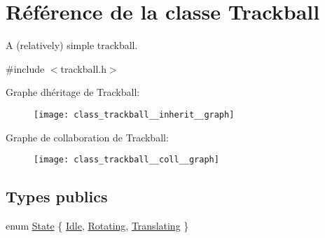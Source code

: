 \hypertarget{class_trackball}{}\section{Référence de la classe Trackball}
\label{class_trackball}


A (relatively) simple trackball.  




{\ttfamily \#include $<$trackball.\+h$>$}



Graphe d\textquotesingle{}héritage de Trackball\+:
\nopagebreak
\begin{figure}[H]
\begin{center}
\leavevmode
\texttt{[image: class\_trackball\_\_inherit\_\_graph]}
\end{center}
\end{figure}


Graphe de collaboration de Trackball\+:
\nopagebreak
\begin{figure}[H]
\begin{center}
\leavevmode
\texttt{[image: class\_trackball\_\_coll\_\_graph]}
\end{center}
\end{figure}
\subsection*{Types publics}
\begin{DoxyCompactItemize}
\item 
enum \hyperlink{class_trackball_a102216413a87cb37801044063a1b05be}{State} \{ \hyperlink{class_trackball_a102216413a87cb37801044063a1b05bea88bef1e83c8258b076d64eff20ca5e5e}{Idle}, 
\hyperlink{class_trackball_a102216413a87cb37801044063a1b05bea50dbabb8cff2af19785a0d60f981a350}{Rotating}, 
\hyperlink{class_trackball_a102216413a87cb37801044063a1b05bea8a733b5b2990e439a541b6615351d382}{Translating}
 \}
\end{DoxyCompactItemize}
